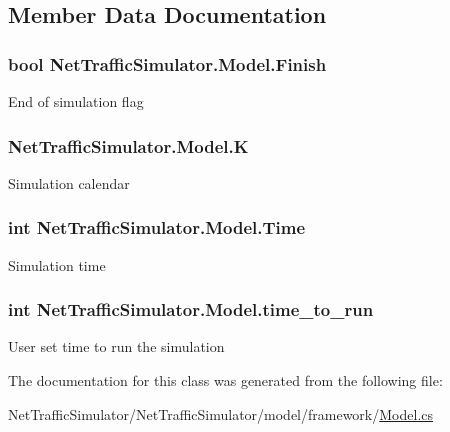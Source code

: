 \subsection{Member Data Documentation}
\hypertarget{classNetTrafficSimulator_1_1Model_a432a4dff6da2b9b3fd331a7add795b30}{
\subsubsection[{Finish}]{\setlength{\rightskip}{0pt plus 5cm}bool Net\-Traffic\-Simulator.\-Model.\-Finish}}\label{classNetTrafficSimulator_1_1Model_a432a4dff6da2b9b3fd331a7add795b30}
End of simulation flag \hypertarget{classNetTrafficSimulator_1_1Model_a9c287410d3e145ae11a089745eeeef6a}{
\subsubsection[{K}]{ Net\-Traffic\-Simulator.\-Model.\-K}}\label{classNetTrafficSimulator_1_1Model_a9c287410d3e145ae11a089745eeeef6a}
Simulation calendar \hypertarget{classNetTrafficSimulator_1_1Model_a5f67bcaaf5bf0115f6b65fe7f8176d2e}{
\subsubsection[{Time}]{\setlength{\rightskip}{0pt plus 5cm}int Net\-Traffic\-Simulator.\-Model.\-Time}}\label{classNetTrafficSimulator_1_1Model_a5f67bcaaf5bf0115f6b65fe7f8176d2e}
Simulation time \hypertarget{classNetTrafficSimulator_1_1Model_aebc7f9cbd7b5173c05d8a382677936b5}{
\subsubsection[{time\-\_\-to\-\_\-run}]{\setlength{\rightskip}{0pt plus 5cm}int Net\-Traffic\-Simulator.\-Model.\-time\-\_\-to\-\_\-run\hspace{0.3cm}{\ttfamily [private]}}}\label{classNetTrafficSimulator_1_1Model_aebc7f9cbd7b5173c05d8a382677936b5}
User set time to run the simulation 

The documentation for this class was generated from the following file\-:\begin{DoxyCompactItemize}
\item 
Net\-Traffic\-Simulator/\-Net\-Traffic\-Simulator/model/framework/\hyperlink{Model_8cs}{Model.\-cs}\end{DoxyCompactItemize}
